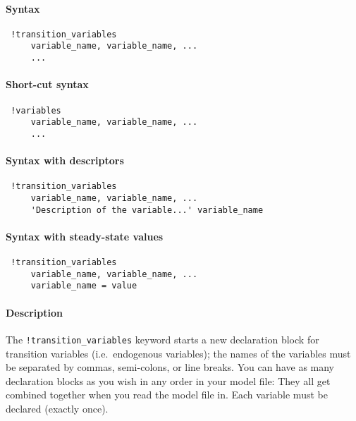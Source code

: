 


	\paragraph{Syntax}
 
 \begin{verbatim}
 !transition_variables
     variable_name, variable_name, ...
     ...
 \end{verbatim}
 
 \paragraph{Short-cut syntax}
 
 \begin{verbatim}
 !variables
     variable_name, variable_name, ...
     ...
 \end{verbatim}
 
 \paragraph{Syntax with descriptors}
 
 \begin{verbatim}
 !transition_variables
     variable_name, variable_name, ...
     'Description of the variable...' variable_name
 \end{verbatim}
 
 \paragraph{Syntax with steady-state values}
 
 \begin{verbatim}
 !transition_variables
     variable_name, variable_name, ...
     variable_name = value
 \end{verbatim}
 
 \paragraph{Description}
 
 The \texttt{!transition\_variables} keyword starts a new declaration
 block for transition variables (i.e.~endogenous variables); the names of
 the variables must be separated by commas, semi-colons, or line breaks.
 You can have as many declaration blocks as you wish in any order in your
 model file: They all get combined together when you read the model file
 in. Each variable must be declared (exactly once).
 
